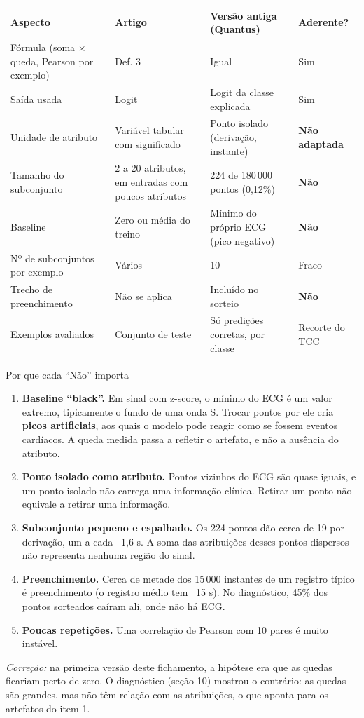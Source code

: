\documentclass[11pt,a4paper]{article}
\begin{document}
\begin{center}\small
\begin{tabularx}{\linewidth}{XXXl}
\toprule
\textbf{Aspecto} & \textbf{Artigo} & \textbf{Versão antiga (Quantus)} & \textbf{Aderente?} \\
\midrule
Fórmula (soma × queda, Pearson por exemplo) & Def. 3 & Igual & Sim \\
Saída usada & Logit & Logit da classe explicada & Sim \\
Unidade de atributo & Variável tabular com significado & Ponto isolado (derivação, instante) & \textbf{Não adaptada} \\
Tamanho do subconjunto & 2 a 20 atributos, em entradas com poucos atributos & 224 de 180\,000 pontos (0,12\%) & \textbf{Não} \\
Baseline & Zero ou média do treino & Mínimo do próprio ECG (pico negativo) & \textbf{Não} \\
Nº de subconjuntos por exemplo & Vários & 10 & Fraco \\
Trecho de preenchimento & Não se aplica & Incluído no sorteio & \textbf{Não} \\
Exemplos avaliados & Conjunto de teste & Só predições corretas, por classe & Recorte do TCC \\
\bottomrule
\end{tabularx}
\end{center}

\begin{infobox}[warn]{Por que cada “Não” importa}
\begin{enumerate}
\item \textbf{Baseline “black”.} Em sinal com z-score, o mínimo do ECG é um valor extremo, tipicamente o fundo de uma onda S. Trocar pontos por ele cria \textbf{picos artificiais}, aos quais o modelo pode reagir como se fossem eventos cardíacos. A queda medida passa a refletir o artefato, e não a ausência do atributo.
\item \textbf{Ponto isolado como atributo.} Pontos vizinhos do ECG são quase iguais, e um ponto isolado não carrega uma informação clínica. Retirar um ponto não equivale a retirar uma informação.
\item \textbf{Subconjunto pequeno e espalhado.} Os 224 pontos dão cerca de 19 por derivação, um a cada ~1,6 s. A soma das atribuições desses pontos dispersos não representa nenhuma região do sinal.
\item \textbf{Preenchimento.} Cerca de metade dos 15\,000 instantes de um registro típico é preenchimento (o registro médio tem ~15 s). No diagnóstico, 45\% dos pontos sorteados caíram ali, onde não há ECG.
\item \textbf{Poucas repetições.} Uma correlação de Pearson com 10 pares é muito instável.
\end{enumerate}
\textit{Correção:} na primeira versão deste fichamento, a hipótese era que as quedas ficariam perto de zero. O diagnóstico (seção 10) mostrou o contrário: as quedas são grandes, mas não têm relação com as atribuições, o que aponta para os artefatos do item 1.
\end{infobox}
\end{document}
